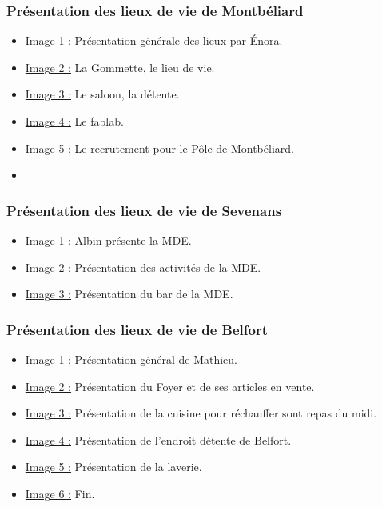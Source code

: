 \subsubsection{Présentation des lieux de vie de Montbéliard}
\begin{itemize}
    \item \underline{Image 1 :} Présentation générale des lieux par Énora.
    \item \underline{Image 2 :} La Gommette, le lieu de vie.
    \item \underline{Image 3 :} Le saloon, la détente.
    \item \underline{Image 4 :} Le fablab.
    \item \underline{Image 5 :} Le recrutement pour le Pôle de Montbéliard.
    \item
\end{itemize}

\subsubsection{Présentation des lieux de vie de Sevenans}
\begin{itemize}
    \item \underline{Image 1 :} Albin présente la MDE.
    \item \underline{Image 2 :} Présentation des activités de la MDE.
    \item \underline{Image 3 :} Présentation du bar de la MDE.
\end{itemize}


\subsubsection{Présentation des lieux de vie de Belfort}
\begin{itemize}
    \item \underline{Image 1 :} Présentation général de Mathieu.
    \item \underline{Image 2 :} Présentation du Foyer et de ses articles en vente.
    \item \underline{Image 3 :} Présentation de la cuisine pour réchauffer sont repas du midi.
    \item \underline{Image 4 :} Présentation de l'endroit détente de Belfort.
    \item \underline{Image 5 :} Présentation de la laverie.
    \item \underline{Image 6 :} Fin.
\end{itemize}





